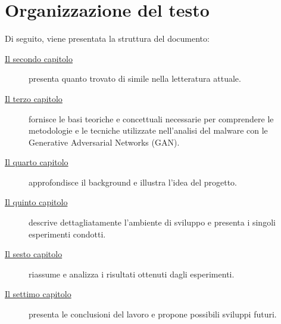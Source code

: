 \section{Organizzazione del testo}
\indent Di seguito, viene presentata la struttura del documento:
\begin{description}
    \item[{\hyperref[cap:RelatedWorks]{Il secondo capitolo}}] presenta quanto trovato di simile nella letteratura attuale.

    \item[{\hyperref[cap:background]{Il terzo capitolo}}] fornisce le basi teoriche e concettuali necessarie per comprendere le metodologie e le tecniche utilizzate nell'analisi del malware con le Generative Adversarial Networks (GAN).

    \item[{\hyperref[cap:descrizione]{Il quarto capitolo}}] approfondisce il background e illustra l'idea del progetto.
    
    \item[{\hyperref[cap:processi-metodologie]{Il quinto capitolo}}] descrive dettagliatamente l'ambiente di sviluppo e presenta i singoli esperimenti condotti.

    \item[{\hyperref[cap:risultati]{Il sesto capitolo}}] riassume e analizza i risultati ottenuti dagli esperimenti.
    
    \item[{\hyperref[cap:conclusioni]{Il settimo capitolo}}] presenta le conclusioni del lavoro e propone possibili sviluppi futuri.
\end{description}
